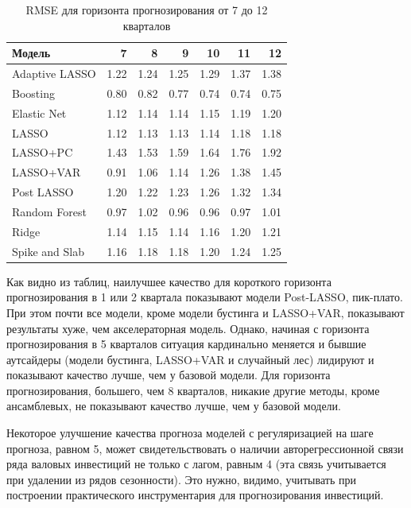 \begin{table}[ht]
\centering
\caption{RMSE для горизонта прогнозирования от 7 до 12 кварталов}
\label{tab:rmse2}
\begin{tabular}{lrrrrrr}
  \hline
Модель & 7 & 8 & 9 & 10 & 11 & 12 \\ 
  \hline
Adaptive LASSO & 1.22 & 1.24 & 1.25 & 1.29 & 1.37 & 1.38 \\ 
  Boosting & 0.80 & 0.82 & 0.77 & 0.74 & 0.74 & 0.75 \\ 
  Elastic Net & 1.12 & 1.14 & 1.14 & 1.15 & 1.19 & 1.20 \\ 
  LASSO & 1.12 & 1.13 & 1.13 & 1.14 & 1.18 & 1.18 \\ 
  LASSO+PC & 1.43 & 1.53 & 1.59 & 1.64 & 1.76 & 1.92 \\ 
  LASSO+VAR & 0.91 & 1.06 & 1.14 & 1.26 & 1.38 & 1.45 \\ 
  Post LASSO & 1.20 & 1.22 & 1.23 & 1.26 & 1.32 & 1.34 \\ 
  Random Forest & 0.97 & 1.02 & 0.96 & 0.96 & 0.97 & 1.01 \\ 
  Ridge & 1.14 & 1.15 & 1.14 & 1.16 & 1.20 & 1.21 \\ 
  Spike and Slab & 1.16 & 1.18 & 1.18 & 1.20 & 1.24 & 1.25 \\ 
   \hline
\end{tabular}
\end{table}

Как видно из таблиц, наилучшее качество для короткого горизонта прогнозирования в 1 или 2 квартала показывают модели Post-LASSO, пик-плато. При этом почти все модели, кроме модели бустинга и LASSO+VAR, показывают результаты хуже, чем акселераторная модель. Однако, начиная с горизонта прогнозирования в 5 кварталов ситуация кардинально меняется и бывшие аутсайдеры (модели бустинга, LASSO+VAR и случайный лес) лидируют и показывают качество лучше, чем у базовой модели. Для горизонта прогнозирования, большего, чем 8 кварталов, никакие другие методы, кроме ансамблевых, не показывают качество лучше, чем у базовой модели. 

Некоторое улучшение качества прогноза моделей с регуляризацией на шаге прогноза, равном 5, может свидетельствовать о наличии авторегрессионной связи ряда валовых инвестиций не только с лагом, равным 4 (эта связь учитывается при удалении из рядов сезонности). Это нужно, видимо, учитывать при построении практического инструментария для прогнозирования инвестиций.

